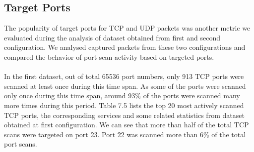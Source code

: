 \subsection{Target Ports}
The popularity of target ports for TCP and UDP packets was another metric we evaluated during the analysis of dataset obtained from first and second configuration.
We analysed captured packets from these two configurations and compared the behavior of port scan activity based on targeted ports.\\\\
\newpage 
\noindent
In the first dataset, out of total 65536 port numbers, only  913 TCP ports were scanned at least once during this time span.
As some of the ports were scanned only once during this time span, around 93\% of the ports were scanned many more times during this period.
Table 7.5 lists the top 20 most actively scanned TCP ports, the corresponding services and some related statistics from dataset obtained at first configuration.
We can see that more than half of the total TCP scans were targeted on port 23.
Port 22 was scanned more than 6\% of the total port scans.
